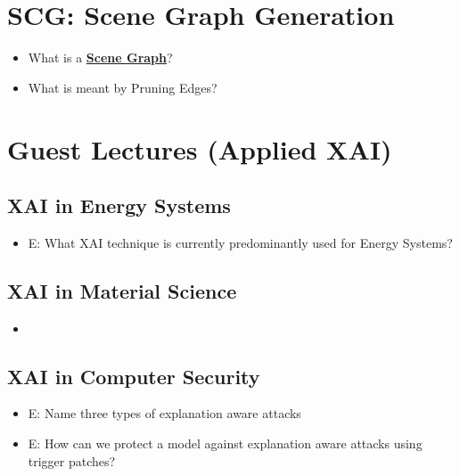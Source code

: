 \documentclass{report}
\newcommand{\asw}[2][teal]{}
\renewcommand{\asw}[2][teal]{\textcolor{#1}{#2}}
\begin{document}
	\section{SCG: Scene Graph Generation}
	
	\begin{itemize}
	\item What is a \textbf{\underline{Scene Graph}}?
	\asw{\newline }
	\item What is meant by Pruning Edges?
	\asw{\newline }
	\end{itemize}

	\section{Guest Lectures (Applied XAI)}
	
		\subsection{XAI in Energy Systems}
		
		\begin{itemize}
		\item E: What XAI technique is currently predominantly used for Energy Systems?
		\asw{\newline }
		\end{itemize}
	
		\subsection{XAI in Material Science}
		
		\begin{itemize}
		\item 
		\end{itemize}
	
		\subsection{XAI in Computer Security}
		
		\begin{itemize}
		\item E: Name three types of explanation aware attacks
		\asw{\newline }
		\item E: How can we protect a model against explanation aware attacks using trigger patches?
		\asw{\newline }
		\end{itemize}
	
\end{document}
